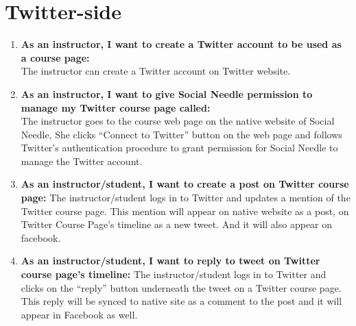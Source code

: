 \section{Twitter-side}


\begin{enumerate}

  \item \textbf{As an instructor, I want to create a Twitter account to be used as a course page:} \\
    The instructor can create a Twitter account on Twitter website.

  \item \textbf{As an instructor, I want to give Social Needle
    permission to manage my Twitter course page called:} \\ The
    instructor goes to the course web page on the native website of
    Social Needle, She clicks ``Connect to Twitter'' button on the web
    page and follows Twitter's authentication procedure to grant
    permission for Social Needle to manage the Twitter account.

    \item \textbf{As an instructor/student, I want to create a post on Twitter
      course page:} The instructor/student logs in to Twitter and updates a
      mention of the Twitter course page. This mention will appear on
      native website as a post, on Twitter Course Page's timeline as a
      new tweet. And it will also appear on facebook.

      \item \textbf {As an instructor/student, I want to reply to
        tweet on Twitter course page's timeline:} The
        instructor/student logs in to Twitter and clicks on the
        ``reply'' button underneath the tweet on a Twitter course
        page. This reply will be synced to native site as a comment to
        the post and it will appear in Facebook as well.

\end{enumerate}

